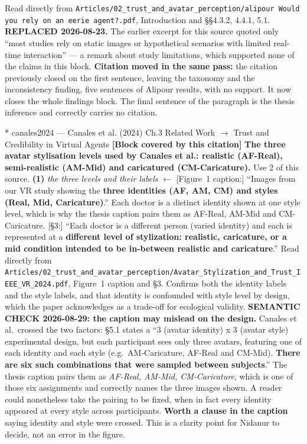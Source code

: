 \documentclass[11pt, a4paper]{article}
\makeatletter
\newcounter{citentry}
\newcommand{\citentry@core}[7]{%
  \stepcounter{citentry}
  \begingroup
  \sbox{\citentry@measurebox}{%
    \begin{minipage}{\linewidth}
      \noindent\colorbox{konstanzblue}{\parbox{\dimexpr\linewidth-2\fboxsep}{%
        \vspace{3pt}
        \textbf{\#\thecitentry \quad #2} \hfill \textit{#3}
        \vspace{3pt}
      }}
      \vspace{3pt}
      \noindent\begin{tabular}{@{}p{2.7cm} p{\dimexpr\linewidth-3cm}@{}}
        \textit{\small Sentence in thesis:} & #4 \\[5pt]
        \textbf{Usage:}\hfill       & #5 \\[5pt]
        \textit{\small Original source:}     & #6 \\[5pt]
        \textbf{How to check:}             & #7 \\
      \end{tabular}
      \vspace{5pt}
      \rule{10pt}{10pt}\quad \textbf{Validated} --- I have read the original and agree it supports the sentence.
    \end{minipage}%
  }%
  \Needspace{\dimexpr\ht\citentry@measurebox+\dp\citentry@measurebox\relax}%
  \endgroup
  \vspace{10pt}
  \noindent\colorbox{konstanzblue}{\parbox{\dimexpr\linewidth-2\fboxsep}{%
    \vspace{3pt}
    \textcolor{white}{\textbf{\#\thecitentry \quad #2}} \hfill \textcolor{white}{\textit{#3}}
    \vspace{3pt}
  }}
  \vspace{3pt}
  \noindent\begin{tabular}{@{}p{2.7cm} p{\dimexpr\linewidth-3cm}@{}}
    \textit{\small Sentence in thesis:} & \textcolor{darkgreen}{#4} \\[5pt]
    \textbf{Usage:}\hfill       & #5 \\[5pt]
    \textit{\small Original source:}     & \textcolor{darkred}{#6} \\[5pt]
    \textbf{How to check:}             & #7 \\
  \end{tabular}
  \vspace{5pt}
  \noindent\CheckBox[name=verified\thecitentry, width=10pt, height=10pt, bordercolor={0 0 0}, borderwidth=0.75, backgroundcolor={1 1 1}#1]{}\quad \textbf{Validated} --- I have read the original and agree it supports the sentence.
  \vspace{3pt}
  \noindent\textcolor{midgray}{\rule{\linewidth}{0.4pt}}
}
\newcommand{\citentry}{\@ifstar{\citentry@core{, checked}}{\citentry@core{}}}
\makeatother
\begin{document}
\begin{Form}
  {Read directly from \texttt{\footnotesize Articles/02\_trust\_and\_avatar\_perception/alipour Would you rely on an eerie agent?.pdf}, Introduction and \S\S4.3.2, 4.4.1, 5.1. \textbf{REPLACED 2026-08-23.} The earlier excerpt for this source quoted only ``most studies rely on static images or hypothetical scenarios with limited real-time interaction'' --- a remark about study limitations, which supported none of the claims in this block. \textbf{Citation moved in the same pass:} the citation previously closed on the first sentence, leaving the taxonomy and the inconsistency finding, five sentences of Alipour results, with no support. It now closes the whole findings block. The final sentence of the paragraph is the thesis inference and correctly carries no citation.}

\citentry*
  {canales2024 --- Canales et al. (2024)}
  {Ch.3 Related Work $\rightarrow$ Trust and Credibility in Virtual Agents}
  {\textbf{[Block covered by this citation]} \textbf{The three avatar stylisation levels used by Canales et al.: realistic (AF-Real), semi-realistic (AM-Mid) and caricatured (CM-Caricature).}}
  {Use 2 of this source.}
  {\textbf{(1)} \emph{the three levels and their labels} $\leftarrow$ [Figure~1 caption:] ``Images from our VR study showing the \textbf{three identities (AF, AM, CM) and styles (Real, Mid, Caricature)}.'' Each doctor is a distinct identity shown at one style level, which is why the thesis caption pairs them as AF-Real, AM-Mid and CM-Caricature. [\S3:] ``Each doctor is a different person (varied identity) and each is represented at a \textbf{different level of stylization: realistic, caricature, or a mid condition intended to be in-between realistic and caricature}.''}
  {Read directly from \texttt{\footnotesize Articles/02\_trust\_and\_avatar\_perception/Avatar\_Stylization\_and\_Trust\_IEEE\_VR\_2024.pdf}, Figure~1 caption and \S3. Confirms both the identity labels and the style labels, and that identity is confounded with style level by design, which the paper acknowledges as a trade-off for ecological validity. \textbf{SEMANTIC CHECK 2026-08-29: the caption may mislead on the design.} Canales et al.\ crossed the two factors: \S5.1 states a ``3 (avatar identity) x 3 (avatar style) experimental design, but each participant sees only three avatars, featuring one of each identity and each style (e.g.\ AM-Caricature, AF-Real and CM-Mid). \textbf{There are six such combinations that were sampled between subjects}.'' The thesis caption pairs them as \emph{AF-Real, AM-Mid, CM-Caricature}, which is one of those six assignments and correctly names the three images shown. A reader could nonetheless take the pairing to be fixed, when in fact every identity appeared at every style across participants. \textbf{Worth a clause in the caption} saying identity and style were crossed. This is a clarity point for Nidanur to decide, not an error in the figure.}



\end{Form}
\end{document}
